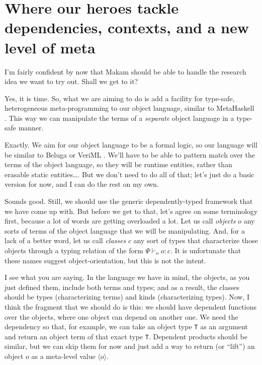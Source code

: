 \section{Where our heroes tackle dependencies, contexts, and a new level
of
meta}\label{where-our-heroes-tackle-dependencies-contexts-and-a-new-level-of-meta}

\heroSTUDENT{} I'm fairly confident by now that Makam should be able to handle
the research idea we want to try out. Shall we get to it?

\heroADVISOR{} Yes, it is time. So, what we are aiming to do is add a facility
for type-safe, heterogeneous meta-programming to our object language,
similar to MetaHaskell \citep{mainland2012explicitly}. This way we can
manipulate the terms of a \emph{separate} object language in a type-safe
manner.

\heroSTUDENT{} Exactly. We aim for our object language to be a formal logic,
so our language will be similar to Beluga \citep{beluga-main-reference}
or VeriML \citep{veriml-main-reference}. We'll have to be able to
pattern match over the terms of the object language, so they will be
runtime entities, rather than erasable static entities\ldots{}. But we
don't need to do all of that; let's just do a basic version for now, and
I can do the rest on my own.

\newcommand\dep[1]{\ensuremath{#1}}
\newcommand\lift[1]{\ensuremath{\langle#1\rangle}}
\newcommand\odash[0]{\ensuremath{\vdash_{\text{o}}}}
\newcommand\wf[0]{\ensuremath{\; \text{wf}}}
\newcommand\aq[1]{\ensuremath{\texttt{aq}(#1)}}

\heroADVISOR{} Sounds good. Still, we should use the generic dependently-typed
framework that we have come up with. But before we get to that, let's
agree on some terminology first, because a lot of words are getting
overloaded a lot. Let us call \emph{objects} \(o\) any sorts of terms of
the object language that we will be manipulating. And, for a lack of a
better word, let us call \emph{classes} \(c\) any sort of types that
characterize those objects through a typing relation of the form
\(\Psi \odash o : c\). It is unfortunate that these names suggest
object-orientation, but this is not the intent.

\heroSTUDENT{} I see what you are saying. In the language we have in mind, the
objects, as you just defined them, include both terms and types; and as
a result, the classes should be types (characterizing terms) and kinds
(characterizing types). Now, I think the fragment that we should do is
this: we should have dependent functions over the objects, where one
object can depend on another one. We need the dependency so that, for
example, we can take an object type \texttt{T} as an argument and return
an object term of that exact type \texttt{T}. Dependent products should
be similar, but we can skip them for now and just add a way to return
(or ``lift'') an object \(o\) as a meta-level value \(\lift{o}\).

